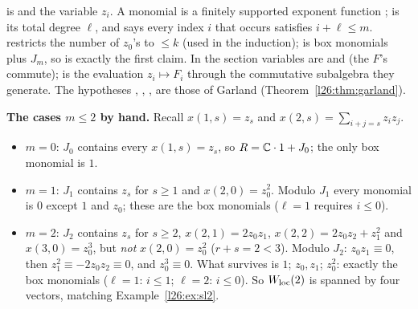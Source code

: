 \begin{dictionary}
 is  and  the variable $z_i$. A monomial is a finitely supported exponent
function ;  is its total degree $\ell$, and  says every index $i$
that occurs satisfies $i+\ell\le m$.  restricts the number of $z_0$'s to $\le k$ (used in the induction);
 is box monomials plus $J_m$, so  is exactly the first claim. In  the
section variables are  and  (the $F$'s commute);  is the
evaluation $z_i\mapsto F_i$ through the commutative subalgebra they generate. The hypotheses , ,
,  are those of Garland (Theorem~\ref{l26:thm:garland}).
\end{dictionary}

\textbf{The cases $m\le2$ by hand.} Recall $x(1,s)=z_s$ and $x(2,s)=\sum_{i+j=s}z_iz_j$.
\begin{itemize}
\item $m=0$: $J_0$ contains every $x(1,s)=z_s$, so $R={\mathbb{C}}\cdot1+J_0$; the only box monomial is $1$.
\item $m=1$: $J_1$ contains $z_s$ for $s\ge1$ and $x(2,0)=z_0^2$. Modulo $J_1$ every monomial is $0$ except $1$ and $z_0$; these are
  the box monomials ($\ell=1$ requires $i\le0$).
\item $m=2$: $J_2$ contains $z_s$ for $s\ge2$, $x(2,1)=2z_0z_1$, $x(2,2)=2z_0z_2+z_1^2$ and $x(3,0)=z_0^3$, but \emph{not}
  $x(2,0)=z_0^2$ ($r+s=2<3$). Modulo $J_2$: $z_0z_1\equiv0$, then $z_1^2\equiv-2z_0z_2\equiv0$, and $z_0^3\equiv0$. What survives is
  $1$; $z_0,z_1$; $z_0^2$: exactly the box monomials ($\ell=1$: $i\le1$; $\ell=2$: $i\le0$). So $W_{\mathrm{loc}}(2)$ is spanned by
  four vectors, matching Example~\ref{l26:ex:sl2}.
\end{itemize}

